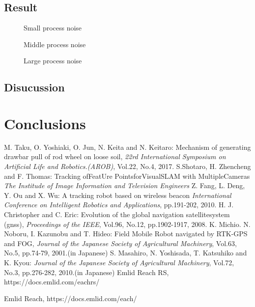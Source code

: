 \documentclass[a4paper]{article}
\begin{document}
\subsection{Result}
%
%
%
\begin{figure}[H]
\centerline{}
\caption{Small process noise}
\centerline{}
\caption{Middle process noise}
\centerline{}
\caption{Large process noise}
\end{figure}
\subsection{Disucussion}
%
%
%
%
%

\section{Conclusions}
%
%
%
%
%
%

\begin{thebibliography}{99}
M. Taku, O. Yoshiaki, O. Jun, N. Keita and N. Keitaro:
Mechanism of generating drawbar pull of rod wheel on loose soil,
{\it 22rd International Symposium on Artificial Life and Robotics.(AROB)}, Vol.22, No.4, 2017.
S.Shotaro, H. Zhencheng and F. Thomas:
Tracking ofFeatUre PointsforVisualSLAM with MultipleCameras
{\it The Institude of Image Information and Television Engineers}
Z. Fang, L. Deng, Y. Ou and X. Wu:
A tracking robot based on wireless beacon
{\it International Conference on Intelligent Robotics and Applications}, pp.191-202, 2010.
H. J. Christopher and C. Eric:
Evolution of the global navigation satellitesystem (gnss),
{\it Proceedings of the IEEE}, Vol.96, No.12, pp.1902-1917, 2008.
K. Michio. N. Noboru, I. Kazunobu and T. Hideo: 
Field Mobile Robot navigated by RTK-GPS and FOG, 
{\it Journal of the Japanese Society of Agricultural Machinery}, Vol.63, No.5, pp.74-79, 2001.(in Japanese)
S. Masahiro, N. Yoshisada, T. Katsuhiko and K. Kyou: 
{\it Journal of the Japanese Society of Agricultural Machinery}, Vol.72, No.3, pp.276-282, 2010.(in Japanese)
Emlid Reach RS, https://docs.emlid.com/eachrs/

Emlid Reach, https://docs.emlid.com/each/
\end{thebibliography}
\end{document}
